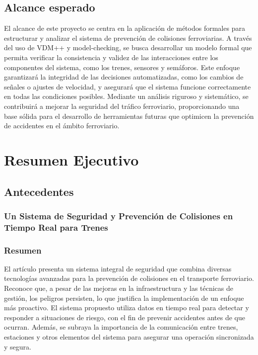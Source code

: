 \documentclass[journal]{IEEEtran}
\begin{document}
\subsection{Alcance esperado}
El alcance de este proyecto se centra en la aplicación de métodos formales para estructurar y analizar el sistema de prevención de colisiones ferroviarias. A través del uso de VDM++ y model-checking, se busca desarrollar un modelo formal que permita verificar la consistencia y validez de las interacciones entre los componentes del sistema, como los trenes, sensores y semáforos. Este enfoque garantizará la integridad de las decisiones automatizadas, como los cambios de señales o ajustes de velocidad, y asegurará que el sistema funcione correctamente en todas las condiciones posibles. Mediante un análisis riguroso y sistemático, se contribuirá a mejorar la seguridad del tráfico ferroviario, proporcionando una base sólida para el desarrollo de herramientas futuras que optimicen la prevención de accidentes en el ámbito ferroviario.


\section{Resumen Ejecutivo}
\subsection{Antecedentes}
\subsubsection{Un Sistema de Seguridad y Prevención de Colisiones en Tiempo Real para Trenes}
\subsubsection*{Resumen}
El artículo presenta un sistema integral de seguridad que combina diversas tecnologías avanzadas para la prevención de colisiones en el transporte ferroviario. Reconoce que, a pesar de las mejoras en la infraestructura y las técnicas de gestión, los peligros persisten, lo que justifica la implementación de un enfoque más proactivo. El sistema propuesto utiliza datos en tiempo real para detectar y responder a situaciones de riesgo, con el fin de prevenir accidentes antes de que ocurran. Además, se subraya la importancia de la comunicación entre trenes, estaciones y otros elementos del sistema para asegurar una operación sincronizada y segura.
\end{document}
